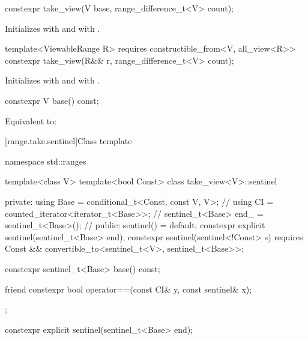 %
\begin{itemdecl}
constexpr take_view(V base, range_difference_t<V> count);
\end{itemdecl}

\begin{itemdescr}
\pnum
\effects Initializes  with  and
 with .
\end{itemdescr}

%
\begin{itemdecl}
template<ViewableRange R>
  requires constructible_from<V, all_view<R>>
constexpr take_view(R&& r, range_difference_t<V> count);
\end{itemdecl}

\begin{itemdescr}
\pnum
\effects Initializes  with 
and  with .
\end{itemdescr}

%
\begin{itemdecl}
constexpr V base() const;
\end{itemdecl}

\begin{itemdescr}
\pnum
\effects Equivalent to: 
\end{itemdescr}

[range.take.sentinel]{Class template }

\begin{codeblock}
namespace std::ranges {
  template<class V>
  template<bool Const>
  class take_view<V>::sentinel {
  private:
    using Base = conditional_t<Const, const V, V>;      // \expos
    using CI = counted_iterator<iterator_t<Base>>;      // \expos
    sentinel_t<Base> end_ = sentinel_t<Base>();         // \expos
  public:
    sentinel() = default;
    constexpr explicit sentinel(sentinel_t<Base> end);
    constexpr sentinel(sentinel<!Const> s)
      requires Const && convertible_to<sentinel_t<V>, sentinel_t<Base>>;

    constexpr sentinel_t<Base> base() const;

    friend constexpr bool operator==(const CI& y, const sentinel& x);
  };
}
\end{codeblock}

\begin{itemdecl}
constexpr explicit sentinel(sentinel_t<Base> end);
\end{itemdecl}

